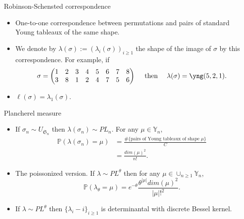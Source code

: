 \documentclass[english,xcolor=table]{beamer}
\begin{document}
\begin{frame}{Robinson-Schensted correspondence}
\begin{itemize}
 
    \item One-to-one correspondence between permutations and pairs of standard Young tableaux of the same shape. 
    \item We denote by $\lambda(\sigma):=(\lambda_i(\sigma))_{i\geq1}$ the shape of the image of  $\sigma$ by this correspondence. 
    For example, if $$\sigma = \begin{pmatrix} 
1 & 2 & 3 & 4 & 5 & 6 & 7 & 8 \\
3 & 8 & 1 & 2 & 4 & 7 & 5 & 6
  \end{pmatrix}  \quad \text { then } \quad \lambda(\sigma)=\yng(5,2,1).$$ 

    \item $\ell(\sigma)=\lambda_1(\sigma).$
\end{itemize}    
\end{frame}

\begin{frame}{Plancherel measure}
\vspace{4 mm}

\begin{itemize}
    \item If $\sigma_n \sim {U}_{\mathfrak{S}_n}$ then $ \lambda(\sigma_n) \sim PL_n$. For any $\mu \in \mathbb{Y}_n$,
    \begin{align*}
    \mathbb{P}(\lambda(\sigma_n)=\mu)&=\frac{\#\{\text{pairs of Young tableaux of shape } \mu\}}{C}\\&=\frac{dim(\mu)^2}{n!}. 
    \end{align*}
    \item The poissonized version. If $ \lambda \sim PL^\theta$ then  for any $\mu \in \cup_{n\geq 1}\mathbb{Y}_n$,
$$    \mathbb{P}(\lambda_\theta=\mu) = e^{-\theta}\frac{\theta^{|\mu|}dim(\mu)^2}{|\mu|!^2}.$$
\item  If  $\lambda \sim PL^\theta$ then $\{\lambda_i-i\}_{i\geq1}$ is determinantal with discrete Bessel kernel. 
\end{itemize}

\end{frame}
\end{document}
